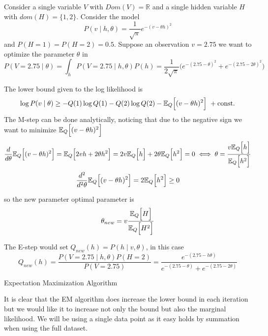 \begin{exampleth}
  Consider a single variable \(V\) with \(Dom(V) = \mathbb{R}\) and a single hidden variable \(H\) with \(dom(H) = \{1,2\}\). Consider the model
  \[
    P(v \mid h, \theta) = \frac{1}{\sqrt{\pi}}e^{-(v - \theta h)^{2}}
  \]
  and \(P(H = 1) = P(H = 2) = 0.5\). Suppose an observation \(v = 2.75\) we want to optimize the parameter \(\theta\) in
  \[
    P(V = 2.75 \mid \theta) = \int_{h} P(V = 2.75 \mid h, \theta) P(h) = \frac{1}{2\sqrt{\pi}}\big( e^{-(2.75 - \theta)^{2}} + e^{-(2.75 - 2\theta)^{2}} \big)
  \]

  The lower bound given to the log likelihood is
  \[
    \log{P(v \mid \theta)} \geq -Q(1)\log{Q(1)} - Q(2)\log{Q(2)} - \mathbb{E}_{Q}\Big[(v - \theta h)^{2}\Big]\ + \text{const.}
  \]
  The M-step can be done analytically, noticing that due to the negative sign we want to minimize \(\mathbb{E}_{Q}\Big[(v - \theta h)^{2}\Big]\)
  \[
    \frac{d}{d\theta}\mathbb{E}_{Q}\Big[(v - \theta h)^{2}\Big] = \mathbb{E}_{Q}\Big[ 2 v h + 2\theta h^{2} \Big] = 2v\mathbb{E}_{Q}\Big[h\Big] + 2\theta \mathbb{E}_{Q}\Big[h^{2}\Big] = 0 \iff \theta = \frac{v\mathbb{E}_{Q}\Big[h\Big]}{\mathbb{E}_{Q}\Big[h^{2}\Big]}
  \]
  \[
     \frac{d^{2}}{d^{2}\theta}\mathbb{E}_{Q}\Big[(v - \theta h)^{2}\Big] = 2\mathbb{E}_{Q}\Big[h^{2}\Big] \geq 0
  \]

  so the new parameter optimal parameter is
  \[
    \theta_{new} = v \frac{\mathbb{E}_{Q}\Big[H\Big]}{\mathbb{E}_{Q}\Big[H^{2}\Big]}
  \]

  The E-step would set \(Q_{new}(h) = P(h \mid v , \theta)\), in this case
  \[
    Q_{new}(h) = \frac{P(V = 2.75 \mid h, \theta)P(H = 2)}{P(V = 2.75)} = \frac{e^{-(2.75-h\theta)}}{ e^{-(2.75-\theta)} + e^{-(2.75-2\theta)}  }
  \]

 \begin{algorithm}[h]
  \SetAlgoLined
  \KwRet{\(\theta\)}\;
  \caption{Expectation Maximization Algorithm}
  \label{alg:pc1}
\end{algorithm}


\end{exampleth}

It is clear that the EM algorithm does increase the lower bound in each iteration but we would like it to increase not only the bound but also the marginal likelihood. We will be using a single data point as it easy holds by summation when using the full dataset.

